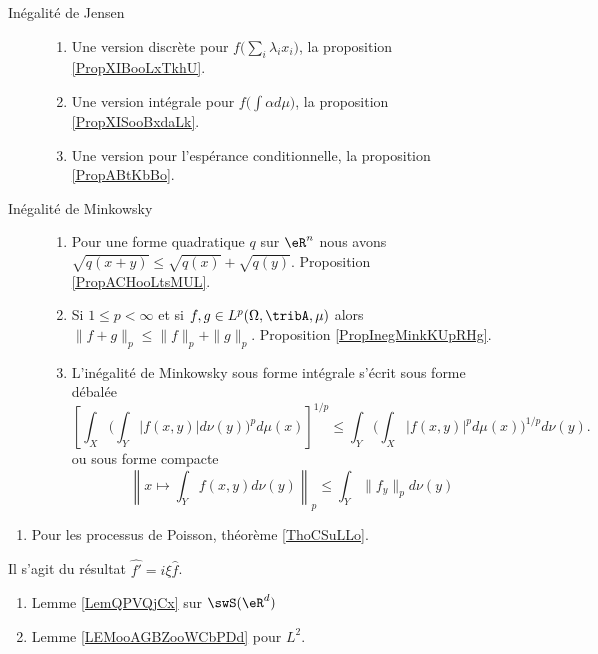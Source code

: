 \begin{description}
    \item[Inégalité de Jensen] 
        \begin{enumerate}
            \item
                Une version discrète pour \( f\big( \sum_i\lambda_ix_i \big)\), la proposition \ref{PropXIBooLxTkhU}.
            \item
                Une version intégrale pour \( f\big( \int \alpha d\mu \big)\), la proposition \ref{PropXISooBxdaLk}.
            \item
                Une version pour l'espérance conditionnelle, la proposition \ref{PropABtKbBo}.
        \end{enumerate}
    \item[Inégalité de Minkowsky]
        \begin{enumerate}
            \item
                Pour une forme quadratique \( q\) sur \( \eR^n\) nous avons $\sqrt{q(x+y)}\leq\sqrt{q(x)}+\sqrt{q(y)}$. Proposition \ref{PropACHooLtsMUL}.
            \item
                Si \( 1\leq p<\infty\) et si \( f,g\in L^p(\Omega,\tribA,\mu)\) alors \(  \| f+g \|_p\leq \| f \|_p+\| g \|_p\). Proposition \ref{PropInegMinkKUpRHg}.
            \item
                L'inégalité de Minkowsky sous forme intégrale s'écrit sous forme débalée
                \begin{equation}
                    \left[ \int_X\Big( \int_Y| f(x,y) |d\nu(y) \Big)^pd\mu(x) \right]^{1/p}\leq \int_Y\Big( \int_X| f(x,y) |^pd\mu(x) \Big)^{1/p}d\nu(y).
                \end{equation}
                ou sous forme compacte
                \begin{equation}
                    \left\|   x\mapsto\int_Y f(x,y)d\nu(y)   \right\|_p\leq \int_Y  \| f_y \|_pd\nu(y)
                \end{equation}
        \end{enumerate}
\end{description}

\begin{enumerate}
    \item
        Pour les processus de Poisson, théorème \ref{ThoCSuLLo}.
\end{enumerate}

      \label{THEMEooJREIooKEdMOl}
Il s'agit du résultat \( \hat{f'}=i\xi \hat{f}\).
\begin{enumerate}
    \item
        Lemme \ref{LemQPVQjCx} sur \( \swS(\eR^d)\)
    \item
        Lemme \ref{LEMooAGBZooWCbPDd} pour \( L^2\).
\end{enumerate}
